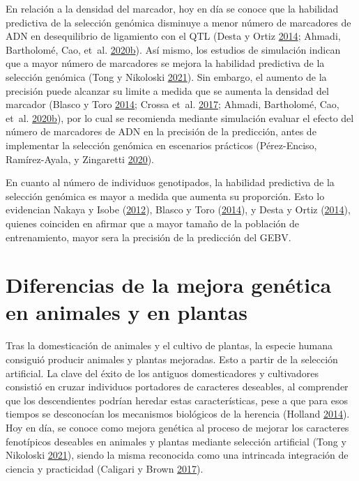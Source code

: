 \documentclass[11pt,spanish,a4paper,oneside,]{book} %
\begin{document}
En relación a la densidad del marcador, hoy en día se conoce que la habilidad predictiva de la selección genómica disminuye a menor número de marcadores de ADN en desequilibrio de ligamiento con el QTL (Desta y Ortiz \protect\hyperlink{ref-cite:10}{2014}; Ahmadi, Bartholomé, Cao, et~al. \protect\hyperlink{ref-cite:45}{2020}\protect\hyperlink{ref-cite:45}{b}). Así mismo, los estudios de simulación indican que a mayor número de marcadores se mejora la habilidad predictiva de la selección genómica (Tong y Nikoloski \protect\hyperlink{ref-cite:7}{2021}). Sin embargo, el aumento de la precisión puede alcanzar su limite a medida que se aumenta la densidad del marcador (Blasco y Toro \protect\hyperlink{ref-cite:3}{2014}; Crossa et~al. \protect\hyperlink{ref-cite:37}{2017}; Ahmadi, Bartholomé, Cao, et~al. \protect\hyperlink{ref-cite:45}{2020}\protect\hyperlink{ref-cite:45}{b}), por lo cual se recomienda mediante simulación evaluar el efecto del número de marcadores de ADN en la precisión de la predicción, antes de implementar la selección genómica en escenarios prácticos (Pérez-Enciso, Ramírez-Ayala, y Zingaretti \protect\hyperlink{ref-cite:47}{2020}).

En cuanto al número de individuos genotipados, la habilidad predictiva de la selección genómica es mayor a medida que aumenta su proporción. Esto lo evidencian Nakaya y Isobe (\protect\hyperlink{ref-cite:6}{2012}), Blasco y Toro (\protect\hyperlink{ref-cite:3}{2014}), y Desta y Ortiz (\protect\hyperlink{ref-cite:10}{2014}), quienes coinciden en afirmar que a mayor tamaño de la población de entrenamiento, mayor sera la precisión de la predicción del GEBV.

\hypertarget{diferencias-de-la-mejora-genuxe9tica-en-animales-y-en-plantas}{%
\section{Diferencias de la mejora genética en animales y en plantas}\label{diferencias-de-la-mejora-genuxe9tica-en-animales-y-en-plantas}}

Tras la domesticación de animales y el cultivo de plantas, la especie humana consiguió producir animales y plantas mejoradas. Esto a partir de la selección artificial. La clave del éxito de los antiguos domesticadores y cultivadores consistió en cruzar individuos portadores de caracteres deseables, al comprender que los descendientes podrían heredar estas características, pese a que para esos tiempos se desconocían los mecanismos biológicos de la herencia (Holland \protect\hyperlink{ref-cite:43}{2014}). Hoy en día, se conoce como mejora genética al proceso de mejorar los caracteres fenotípicos deseables en animales y plantas mediante selección artificial (Tong y Nikoloski \protect\hyperlink{ref-cite:7}{2021}), siendo la misma reconocida como una intrincada integración de ciencia y practicidad (Caligari y Brown \protect\hyperlink{ref-cite:42}{2017}).
\end{document}
